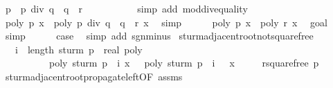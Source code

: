 \begin{isabellebody}
\ {\isachardoublequoteopen}{\isacharquery}p\ {\isacharequal}\ {\isacharquery}p\ div\ {\isacharquery}q\ {\isacharasterisk}\ {\isacharquery}q\ {\isacharminus}\ {\isacharquery}r{\isachardoublequoteclose}\ \isanewline
\ \ \ \ \ \ \ \ \isamarkupfalse%
\ {\isacharparenleft}simp\ add{\isacharcolon}\ mod{\isacharunderscore}div{\isacharunderscore}equality{\isacharparenright}\isanewline
\ \ \ \ \isamarkupfalse%
\ {\isachardoublequoteopen}poly\ {\isacharquery}p\ x\ {\isacharequal}\ poly\ {\isacharparenleft}{\isacharquery}p\ div\ {\isacharquery}q\ {\isacharasterisk}\ {\isacharquery}q\ {\isacharminus}\ {\isacharquery}r{\isacharparenright}\ x{\isachardoublequoteclose}\ \isamarkupfalse%
\ simp\isanewline
\ \ \ \ \isamarkupfalse%
\ {\isachardoublequoteopen}poly\ {\isacharquery}p\ x\ {\isacharequal}\ {\isacharminus}poly\ {\isacharquery}r\ x{\isachardoublequoteclose}\ \isamarkupfalse%
\ goal{}{\isacharparenleft}{}{\isacharparenright}\ \isamarkupfalse%
\ simp\isanewline
\ \ \ \ \isamarkupfalse%
\ {\isacharquery}case\ \isamarkupfalse%
\ {\isacharparenleft}simp\ add{\isacharcolon}\ sgn{\isacharunderscore}minus{\isacharparenright}\isanewline
{}\isamarkupfalse%
%
\endisatagproof
{\isafoldproof}%
%
\isadelimproof
\isanewline
%
\endisadelimproof
\isanewline
\isanewline
{}\isamarkupfalse%
\ sturm{\isacharunderscore}adjacent{\isacharunderscore}root{\isacharunderscore}not{\isacharunderscore}squarefree{\isacharcolon}\isanewline
\ \ \ {\isachardoublequoteopen}i\ {\isacharless}\ length\ {\isacharparenleft}sturm\ {\isacharparenleft}p\ {\isacharcolon}{\isacharcolon}\ real\ poly{\isacharparenright}{\isacharparenright}\ {\isacharminus}\ {}{\isachardoublequoteclose}\isanewline
\ \ \ \ \ \ \ \ \ \ {\isachardoublequoteopen}poly\ {\isacharparenleft}sturm\ p\ {\isacharbang}\ i{\isacharparenright}\ x\ {\isacharequal}\ {}{\isachardoublequoteclose}\ {\isachardoublequoteopen}poly\ {\isacharparenleft}sturm\ p\ {\isacharbang}\ {\isacharparenleft}i\ {\isacharplus}\ {}{\isacharparenright}{\isacharparenright}\ x\ {\isacharequal}\ {}{\isachardoublequoteclose}\isanewline
\ \ \ {\isachardoublequoteopen}{\isasymnot}rsquarefree\ p{\isachardoublequoteclose}\isanewline
%
\isadelimproof
%
\endisadelimproof
%
\isatagproof
{}\isamarkupfalse%
{\isacharminus}\isanewline
\ \ \isamarkupfalse%
\ sturm{\isacharunderscore}adjacent{\isacharunderscore}root{\isacharunderscore}propagate{\isacharunderscore}left{\isacharbrackleft}OF\ assms{\isacharbrackright}\isanewline

\end{isabellebody}
